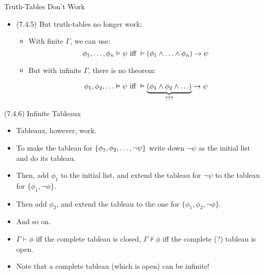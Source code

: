 \documentclass[../slides.tex]{subfiles}
\begin{document}
\begin{frame}{Truth-Tables Don't Work}
	
	\begin{itemize}
	
		\item (7.4.5) But truth-tables no longer work:
		
			\begin{itemize}
			
				\item With finite $\Gamma$, we can use: \[\phi_1,\mathellipsis, \phi_n\vDash \psi\text{ iff }\vDash (\phi_1\land\mathellipsis\land\phi_n)\to\psi\]
				
				\item But with infinite $\Gamma$, there is no theorem:
				
				\[\phi_1,\phi_2,\mathellipsis\vDash \psi\text{ iff }\vDash \underbrace{(\phi_1\land\phi_2\land\mathellipsis)}_{???}\to\psi\]
			
			\end{itemize}
	
	\end{itemize}

\end{frame}

\begin{frame}{(7.4.6) Infinite Tableaux}

	\begin{itemize}
	
		\item  Tableaux, however, work.
		
		\item To make the tableau for $\{\phi_1,\phi_2,\mathellipsis,\neg\psi\}$ write down $\neg \psi$ as the initial list and do its tableau.
		
		\item Then, add $\phi_1$ to the initial list, and extend the tableau for $\neg\psi$ to the tableau for $\{\phi_1,\neg\phi\}$.
		
		\item Then add $\phi_2$, and extend the tableau to the one for $\{\phi_1,\phi_2,\neg\phi\}$.
		
		\item And so on.
		
		\item $\Gamma\vdash\phi$ iff the complete tableau is closed, $\Gamma\nvdash\phi$ iff the complete (?) tableau is open.
		
		\item Note that a complete tableau (which is open) can be infinite!
	
	\end{itemize}

\end{frame}
\end{document}
